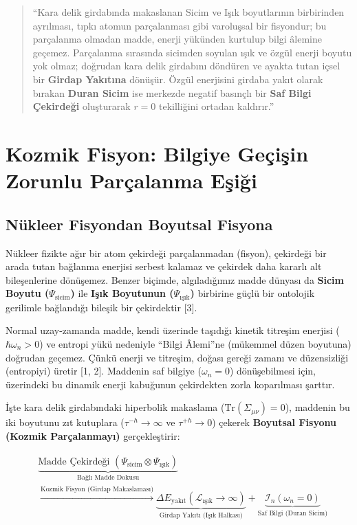 \documentclass[12pt,a4paper]{article}
\begin{document}
\begin{quote}
``Kara delik girdabında makaslanan Sicim ve Işık boyutlarının birbirinden ayrılması, tıpkı atomun parçalanması gibi varoluşsal bir fisyondur; bu parçalanma olmadan madde, enerji yükünden kurtulup bilgi âlemine geçemez. Parçalanma sırasında sicimden soyulan ışık ve özgül enerji boyutu yok olmaz; doğrudan kara delik girdabını döndüren ve ayakta tutan içsel bir \textbf{Girdap Yakıtına} dönüşür. Özgül enerjisini girdaba yakıt olarak bırakan \textbf{Duran Sicim} ise merkezde negatif basınçlı bir \textbf{Saf Bilgi Çekirdeği} oluşturarak $r=0$ tekilliğini ortadan kaldırır.''
\end{quote}

\section{Kozmik Fisyon: Bilgiye Geçişin Zorunlu Parçalanma Eşiği}

\subsection{Nükleer Fisyondan Boyutsal Fisyona}

Nükleer fizikte ağır bir atom çekirdeği parçalanmadan (fisyon), çekirdeği bir arada tutan bağlanma enerjisi serbest kalamaz ve çekirdek daha kararlı alt bileşenlerine dönüşemez. Benzer biçimde, algıladığımız madde dünyası da \textbf{Sicim Boyutu ($\Psi_{\text{sicim}}$)} ile \textbf{Işık Boyutunun ($\Psi_{\text{ışık}}$)} birbirine güçlü bir ontolojik gerilimle bağlandığı bileşik bir çekirdektir [3].

Normal uzay-zamanda madde, kendi üzerinde taşıdığı kinetik titreşim enerjisi ($\hbar \omega_n > 0$) ve entropi yükü nedeniyle ``Bilgi Âlemi''ne (mükemmel düzen boyutuna) doğrudan geçemez. Çünkü enerji ve titreşim, doğası gereği zamanı ve düzensizliği (entropiyi) üretir [1, 2]. Maddenin saf bilgiye ($\omega_n = 0$) dönüşebilmesi için, üzerindeki bu dinamik enerji kabuğunun çekirdekten zorla koparılması şarttır.

İşte kara delik girdabındaki hiperbolik makaslama ($\text{Tr}(\Sigma_{\mu\nu}) = 0$), maddenin bu iki boyutunu zıt kutuplara ($\tau^{-h} \to \infty$ ve $\tau^{+h} \to 0$) çekerek \textbf{Boyutsal Fisyonu (Kozmik Parçalanmayı)} gerçekleştirir:

\begin{equation}
\begin{aligned}
&\underbrace{\text{Madde Çekirdeği } (\Psi_{\text{sicim}} \otimes \Psi_{\text{ışık}})}_{\text{Bağlı Madde Dokusu}} \\
&\xrightarrow{\text{Kozmik Fisyon (Girdap Makaslaması)}} \underbrace{\Delta E_{\text{yakıt}}(\mathcal{L}_{\text{ışık}} \to \infty)}_{\text{Girdap Yakıtı (Işık Halkası)}} + \underbrace{\mathcal{I}_n (\omega_n = 0)}_{\text{Saf Bilgi (Duran Sicim)}}
\end{aligned}
\end{equation}
\end{document}
